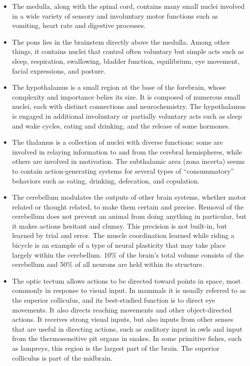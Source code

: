 \begin{itemize}
\tightlist
\item
  The medulla, along with the spinal cord, contains many small nuclei involved in a wide variety of sensory and involuntary motor functions such as vomiting, heart rate and digestive processes.
\item
  The pons lies in the brainstem directly above the medulla. Among other things, it contains nuclei that control often voluntary but simple acts such as sleep, respiration, swallowing, bladder function, equilibrium, eye movement, facial expressions, and posture.
\item
  The hypothalamus is a small region at the base of the forebrain, whose complexity and importance belies its size. It is composed of numerous small nuclei, each with distinct connections and neurochemistry. The hypothalamus is engaged in additional involuntary or partially voluntary acts such as sleep and wake cycles, eating and drinking, and the release of some hormones.
\item
  The thalamus is a collection of nuclei with diverse functions: some are involved in relaying information to and from the cerebral hemispheres, while others are involved in motivation. The subthalamic area (zona incerta) seems to contain action-generating systems for several types of ``consummatory'' behaviors such as eating, drinking, defecation, and copulation.
\item
  The cerebellum modulates the outputs of other brain systems, whether motor related or thought related, to make them certain and precise. Removal of the cerebellum does not prevent an animal from doing anything in particular, but it makes actions hesitant and clumsy. This precision is not built-in, but learned by trial and error. The muscle coordination learned while riding a bicycle is an example of a type of neural plasticity that may take place largely within the cerebellum. 10\% of the brain's total volume consists of the cerebellum and 50\% of all neurons are held within its structure.
\item
  The optic tectum allows actions to be directed toward points in space, most commonly in response to visual input. In mammals it is usually referred to as the superior colliculus, and its best-studied function is to direct eye movements. It also directs reaching movements and other object-directed actions. It receives strong visual inputs, but also inputs from other senses that are useful in directing actions, such as auditory input in owls and input from the thermosensitive pit organs in snakes. In some primitive fishes, such as lampreys, this region is the largest part of the brain. The superior colliculus is part of the midbrain.

\end{itemize}

